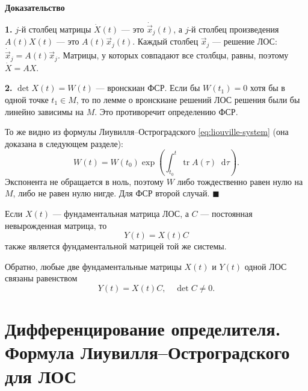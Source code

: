 \documentclass[12pt,a4paper]{article}
\numberwithin{equation}{section}
\newcommand{\vect}[1]{\vec{#1}}
\newcommand{\tr}{\operatorname{tr}}
\newcommand{\dd}{\mathop{}\!\mathrm{d}}
\renewenvironment{proof}[1][Доказательство]{\begin{center}\textbf{#1}\end{center}}{\hfill$\blacksquare$\par}
\DeclareRobustCommand{\examtag}[1]{\space{\normalfont\small\color{HSEgray}(#1)}}
\begin{document}
\begin{proof}
\textbf{1.} \(j\)-й столбец матрицы \(\dot X(t)\) --- это \(\dot{\vect{x}}_j(t)\), а \(j\)-й столбец произведения \(A(t)X(t)\) --- это \(A(t)\vect{x}_j(t)\). Каждый столбец \(\vect{x}_j\) --- решение ЛОС: \(\dot{\vect{x}}_j=A(t)\vect{x}_j\). Матрицы, у которых совпадают все столбцы, равны, поэтому \(\dot X=AX\).

\textbf{2.} \(\det X(t)=W(t)\) --- вронскиан ФСР. Если бы \(W(t_1)=0\) хотя бы в одной точке \(t_1\in M\), то по лемме о вронскиане решений ЛОС решения были бы линейно зависимы на \(M\). Это противоречит определению ФСР.

То же видно из формулы Лиувилля--Остроградского \eqref{eq:liouville-system} (она доказана в следующем разделе):
\[
W(t)=W(t_0)\exp\left(\int_{t_0}^{t}\tr A(\tau)\dd\tau\right).
\]
Экспонента не обращается в ноль, поэтому \(W\) либо тождественно равен нулю на \(M\), либо не равен нулю нигде. Для ФСР второй случай.
\end{proof}

\begin{theoremHSE}
Если $X(t)$ --- фундаментальная матрица ЛОС, а $C$ --- постоянная невырожденная матрица, то
\[
Y(t)=X(t)C
\]
также является фундаментальной матрицей той же системы.

Обратно, любые две фундаментальные матрицы $X(t)$ и $Y(t)$ одной ЛОС связаны равенством
\[
Y(t)=X(t)C,
\quad \det C\neq0.
\]
\end{theoremHSE}

\section[Производная определителя и вронскиан ЛОС\examtag{вопрос~15}]{Дифференцирование определителя.\\Формула Лиувилля--Остроградского для ЛОС\examtag{вопрос~15}}
\end{document}
